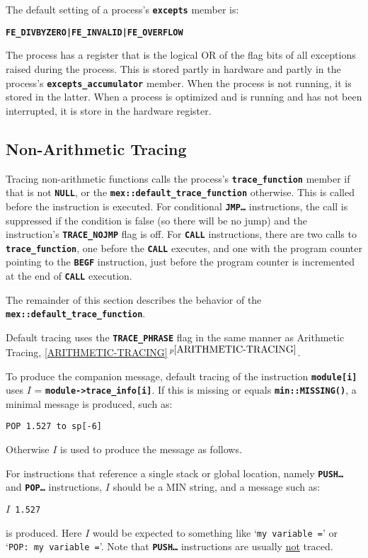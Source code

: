 \documentclass[12pt]{article}
\newcommand{\TT}[1]{{\tt \bfseries #1}}
\newcommand{\itemref}[1]{\ref{#1}$\,^{p\pageref{#1}}$}
\newcommand{\EOL}{\penalty \exhyphenpenalty}
\begin{document}
The default setting of a process's \TT{excepts} member
is:
\begin{center}
\TT{FE\_DIVBYZERO|FE\_INVALID|FE\_OVERFLOW}
\end{center}

The process has a register that is the logical OR of the flag bits
of all exceptions
raised during the process.  This is stored partly in hardware
and partly in the process's \TT{excepts\_\EOL accumulator} member.
When the process is not running, it is stored in the latter.  When
a process is optimized and is running and has not been interrupted,
it is store in the hardware register.

\subsection{Non-Arithmetic Tracing}
\label{NON-ARITHMETIC-TRACING}

Tracing non-arithmetic functions calls the process's
\TT{trace\_function} member if that is not \TT{NULL},
or the \TT{mex::\EOL default\_\EOL trace\_\EOL function}
otherwise.  This is called before the instruction is
executed.  For conditional \TT{JMP\ldots} instructions,
the call is suppressed if the condition is false (so there
will be no jump) and the instruction's \TT{TRACE\_NOJMP}
flag is off.  For \TT{CALL} instructions, there are two
calls to \TT{trace\_function}, one before the \TT{CALL}
executes, and one with the program counter pointing
to the \TT{BEGF} instruction, just before the program
counter is incremented at the end of \TT{CALL} execution.

The remainder of this section describes the behavior of
the \TT{mex::\EOL default\_\EOL trace\_\EOL function}.

Default tracing uses the \TT{TRACE\_PHRASE} flag in the
same manner as Arithmetic Tracing, \itemref{ARITHMETIC-TRACING}.

To produce the companion message,
default tracing of the instruction \TT{module[i]} uses
$I$ = \TT{module->trace\_info[i]}.  If this is missing
or equals \TT{min::MISSING()}, a minimal message
is produced, such as:
\begin{center}
\tt POP 1.527 to sp[-6]
\end{center}
Otherwise $I$ is used to produce the message as follows.

For instructions that reference a single stack or global location,
namely \TT{PUSH\ldots} and \TT{POP\ldots} instructions,
$I$ should be a MIN string, and a message such
as:
\begin{center}
\tt $I$ 1.527
\end{center}
is produced.  Here $I$ would be expected to something
like `{\tt my variable =}' or `{\tt POP: my variable =}'.
Note that \TT{PUSH\ldots} instructions are usually
\underline{not} traced.
\end{document}
